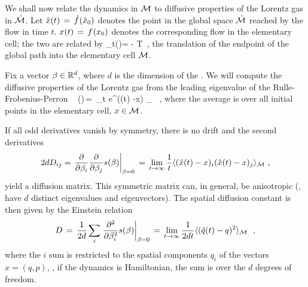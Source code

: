 \documentclass[aps,pre,preprint,groupedaddress,floatfix]{revtex4-1}
\begin{document}
We shall now relate the dynamics in ${\cal M}$ to diffusive properties of the Lorentz gas in $\hat {{\cal M}}$. Let $\hat x(t)\,=\,{\hat{f}^{}(\hat x_0)}$ denotes the point in the global space $\hat {{\cal M}}$ reached by the flow in time $t$. $x(t)\,=\,{f^{}({x_0})}$ denotes the corresponding flow in the elementary cell; the two are related by
\beq
\hn_t(\xInit)= \hflow{\xInit} - \flow{\xInit} \in T
\,,
the translation of the endpoint of the global path into the elementary cell $\pS$.

Fix a vector $\beta \in \reals^d$, where $d$ is the dimension of the {\statesp}. We will compute the diffusive properties of the Lorentz gas from the leading eigenvalue of the Rulle-Frobenius-Perron \evOper\
\beq
\eigenvL(\beta)\,=\, \lim_{t \rightarrow \infty}  \log
\langle e^{\beta \cdot (\hx(t) -x) } \rangle_\pS
~, \quad
{} 
where the average is over all initial points in the elementary cell, $x \in \pS$. %

If all odd derivatives vanish by symmetry, there is no drift and the second derivatives
\[
2d D_{ij} =
\left . {{\partial} \over {\partial \beta_i}}
{{\partial} \over {\partial \beta_j}}
\eigenvL(\beta)\right |_{\beta=0} \,=\,\lim_{t\rightarrow \infty} {1\over t}
\langle {(\hx(t) -x)_i (\hx(t) -x)_j } \rangle_\pS ~,
\]
yield a diffusion matrix.  This symmetric matrix can, in general, be anisotropic (\ie, have $d$ distinct eigenvalues and eigen\-vectors). The spatial diffusion constant is then given by the Einstein relation 
\[
D\,=\,{1\over 2 d} \sum_i
\left .{{\partial}^2 \over {\partial \beta^2_i}}
s(\beta)\right |_{\beta=0}
\,=\, \lim_{t\rightarrow \infty} {1\over{2d t}}
\langle {(\hat{q}(t) -q)^2 } \rangle_{{\cal M}}~
~,
\]
where the $i$ sum is restricted to the spatial components $q_i$ of the {\statesp} vectors $x=(q,p)$, \ie, if the dynamics is Hamiltonian, the sum is over the $d$ degrees of freedom.

\end{document}
